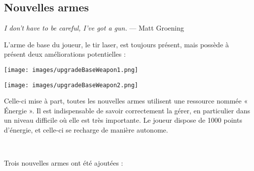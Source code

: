 \documentclass[12pt,a4paper]{article}
\begin{document}
\subsection{Nouvelles armes}
\par \emph{I don't have to be careful, I've got a gun.} --- Matt Groening
\vspace{0.8cm}
\par L'arme de base du joueur, le tir laser, est toujours présent, mais possède à présent deux améliorations potentielles :
\vspace{2cm}
\par \texttt{[image: images/upgradeBaseWeapon1.png]}
\par \texttt{[image: images/upgradeBaseWeapon2.png]}
\vspace{2cm}
\par Celle-ci mise à part, toutes les nouvelles armes utilisent une ressource nommée « Énergie ». Il est indispensable de savoir correctement la gérer, en particulier dans un niveau difficile où elle est très importante. Le joueur dispose de 1000 points d'énergie, et celle-ci se recharge de manière autonome.
\par~
\par Trois nouvelles armes ont été ajoutées :
\vspace{0.5cm}
\end{document}
